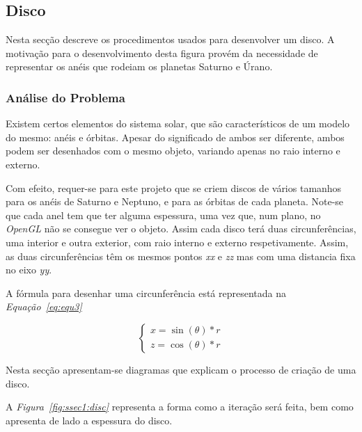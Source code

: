 \newpage


\subsection{Disco}
Nesta secção descreve os procedimentos usados para desenvolver um disco.
A motivação para o desenvolvimento desta figura provém da necessidade de
representar os anéis que rodeiam os planetas Saturno e Úrano.


\subsubsection{Análise do Problema}

Existem certos elementos do sistema solar, que são característicos de um modelo
do mesmo: anéis e órbitas. Apesar do significado de ambos ser diferente, ambos
podem ser desenhados com o mesmo objeto, variando apenas no raio interno
e externo.

Com efeito, requer-se para este projeto que se criem discos de vários tamanhos
para os anéis de Saturno e Neptuno, e para as órbitas de cada planeta. Note-se
que cada anel tem que ter alguma espessura, uma vez que, num plano, no
\emph{OpenGL} não se consegue ver o objeto. Assim cada disco terá duas
circunferências, uma interior e outra exterior, com raio interno e externo
respetivamente. Assim, as duas circunferências têm os mesmos pontos \emph{xx}
e \emph{zz} mas com uma distancia fixa no eixo \emph{yy}. 

A fórmula para desenhar uma circunferência está representada na
\emph{Equação~\ref{eq:equ3}} 

\begin{equation}
\begin{cases}
			x =  \sin(\theta) * r \\
	    z =  \cos(\theta) * r
\end{cases}
\label{eq:equ3}
\end{equation}



Nesta secção apresentam-se diagramas que explicam o processo de criação de uma
disco.

A \emph{Figura~\ref{fig:ssec1:disc}} representa a forma como a iteração será
feita, bem como apresenta de lado a espessura do disco.



